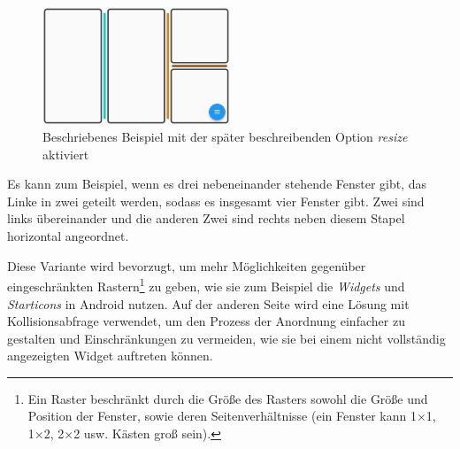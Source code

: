 \documentclass[10pt]{article}
\begin{document}
\begin{figure}
  \centering 
  \includegraphics[width=0.5\textwidth]{Resizeline.png}
  \caption{Beschriebenes Beispiel mit der später beschreibenden Option \textit{resize} aktiviert}
\end{figure}
Es kann zum Beispiel, wenn es drei nebeneinander stehende Fenster gibt, das Linke in zwei geteilt werden, sodass es insgesamt vier Fenster gibt. Zwei sind links übereinander und die anderen Zwei sind rechts neben diesem Stapel horizontal angeordnet. 

Diese Variante wird bevorzugt, um mehr Möglichkeiten gegenüber eingeschränkten Rastern\footnote{Ein Raster beschränkt durch die Größe des Rasters sowohl die Größe und Position der Fenster, sowie deren Seitenverhältnisse (ein Fenster kann 1×1, 1×2, 2×2 usw. Kästen groß sein).} zu geben, wie sie zum Beispiel die \textit{Widgets} und \textit{Starticons} in Android nutzen.
Auf der anderen Seite wird eine Lösung mit Kollisionsabfrage verwendet, um den Prozess der Anordnung einfacher zu gestalten und Einschränkungen zu vermeiden, wie sie bei einem nicht vollständig angezeigten Widget auftreten können. 
\end{document}
